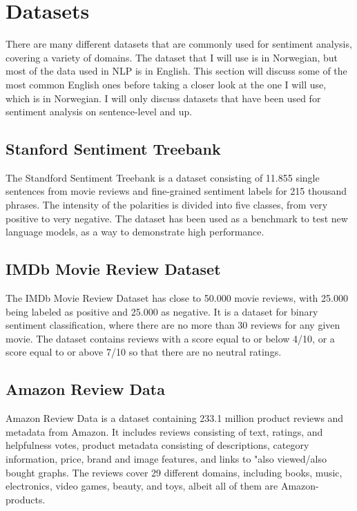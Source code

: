 
\section{Datasets}
There are many different datasets that are commonly used for sentiment analysis, covering a variety of domains. The dataset that I will use is in Norwegian, but most of the data used in NLP is in English. This section will discuss some of the most common English ones before taking a closer look at the one I will use, which is in Norwegian. I will only discuss datasets that have been used for sentiment analysis on sentence-level and up.
\subsection{Stanford Sentiment Treebank}
The Standford Sentiment Treebank \cite{socher2013recursive} is a dataset consisting of 11.855 single sentences from movie reviews and fine-grained sentiment labels for 215 thousand phrases. The intensity of the polarities is divided into five classes, from very positive to very negative. The dataset has been used as a benchmark to test new language models, as a way to demonstrate high performance.
\subsection{IMDb Movie Review Dataset}
The IMDb Movie Review Dataset \cite{maas-EtAl:2011:ACL-HLT2011} has close to 50.000 movie reviews, with 25.000 being labeled as positive and 25.000 as negative. It is a dataset for binary sentiment classification, where there are no more than 30 reviews for any given movie. The dataset contains reviews with a score equal to or below 4/10, or a score equal to or above 7/10 so that there are no neutral ratings.
\subsection{Amazon Review Data}
Amazon Review Data \cite{ni2019justifying} is a dataset containing 233.1 million product reviews and metadata from Amazon. It includes reviews consisting of text, ratings, and helpfulness votes, product metadata consisting of descriptions, category information, price, brand and image features, and links to "also viewed/also bought graphs. The reviews cover 29 different domains, including books, music, electronics, video games, beauty, and toys, albeit all of them are Amazon-products.

